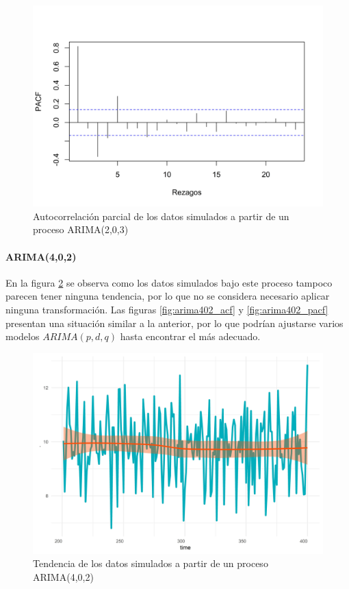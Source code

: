\documentclass[
]{article}
\begin{document}
\begin{figure}[H]
\includegraphics[width=1\linewidth,height=1\textheight]{Tesis_files/figure-latex/arima203_pacf-1} \caption{Autocorrelación parcial de los datos simulados a partir de un proceso ARIMA(2,0,3)}\label{fig:arima203_pacf}
\end{figure}

\paragraph{ARIMA(4,0,2)}

En la figura \ref{fig:arima402_comportamiento} se observa como los datos
simulados bajo este proceso tampoco parecen tener ninguna tendencia, por
lo que no se considera necesario aplicar ninguna transformación. Las
figuras \ref{fig:arima402_acf} y \ref{fig:arima402_pacf} presentan una
situación similar a la anterior, por lo que podrían ajustarse varios
modelos \(ARIMA(p,d,q)\) hasta encontrar el más adecuado.

\begin{figure}[H]
\includegraphics[width=1\linewidth,height=1\textheight]{Tesis_files/figure-latex/arima402_comportamiento-1} \caption{Tendencia de los datos simulados a partir de un proceso ARIMA(4,0,2)}\label{fig:arima402_comportamiento}
\end{figure}
\end{document}
